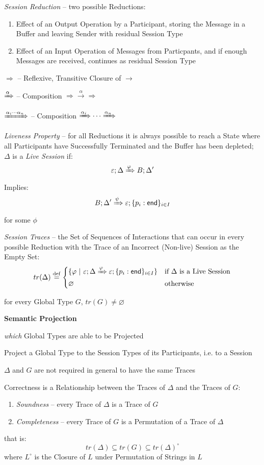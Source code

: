 \emph{Session Reduction} -- two possible Reductions: %
\begin{enumerate}
  \item Effect of an Output Operation by a Participant, storing the
    Message in a Buffer and leaving Sender with residual Session Type
  \item Effect of an Input Operation of Messages from Particpants, and
    if enough Messages are received, continues as residual Session
    Type
\end{enumerate}

$\Rightarrow$ -- Reflexive, Transitive Closure of $\rightarrow$

$\xRightarrow{\alpha}$ -- Composition $\Rightarrow
\xrightarrow{\alpha} \Rightarrow$

$\xRightarrow{\alpha_i\cdots\alpha_n}$ -- Composition
$\xRightarrow{\alpha_i}\cdots\xRightarrow{\alpha_n}$

\emph{Liveness Property} -- for all Reductions it is always possible to
reach a State where all Participants have Successfully Terminated and
the Buffer has been depleted; $\Delta$ is a \emph{Live Session} if:
\[
  \varepsilon ; \Delta \xRightarrow{\varphi} B; \Delta'
\]
Implies:
\[
  B ; \Delta' \xRightarrow{\psi} \varepsilon ;
    \{ p_i : \mathsf{end} \}_{i \in I}
\]
for some $\phi$


\emph{Session Traces} -- the Set of Sequences of Interactions that can
occur in every possible Reduction with the Trace of an Incorrect
(Non-live) Session as the Empty Set:
\[
  tr(\Delta) \stackrel{\mathrm{def}}=
    \begin{cases}
      \{ \varphi \ |\ \varepsilon ;
        \Delta \xRightarrow{\varphi} \varepsilon;
        \{ p_i : \mathsf{end} \}_{i \in I} \}
        & \text{if} \ \Delta\ \text{is a Live Session} \\
      \varnothing & \text{otherwise}
    \end{cases}
\]

for every Global Type $G$, $tr(G) \neq \varnothing$


\textbf{Semantic Projection}

\emph{which} Global Types are able to be Projected

Project a Global Type to the Session Types of its Participants, i.e.
to a Session

$\Delta$ and $G$ are not required in general to have the same Traces

Correctness is a Relationship between the Traces of $\Delta$ and the
Traces of $G$:
\begin{enumerate}
  \item \emph{Soundness} -- every Trace of $\Delta$ is a Trace of $G$
  \item \emph{Completeness} -- every Trace of $G$ is a Permutation of
    a Trace of $\Delta$
\end{enumerate}
that is:
\[
  tr(\Delta) \subseteq tr(G) \subseteq tr(\Delta)^\circ
\]
where $L^\circ$ is the Closure of $L$ under Permutation of Strings in
$L$

